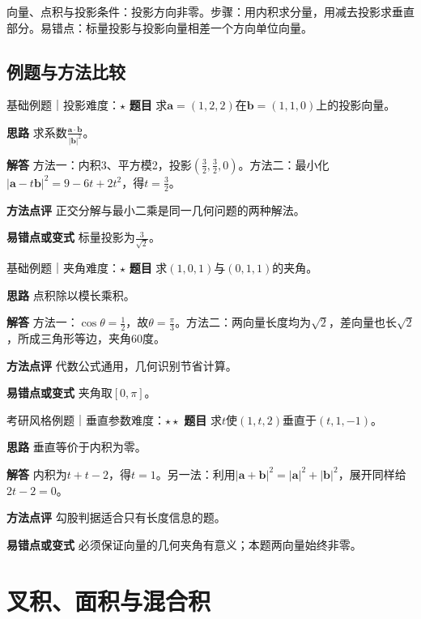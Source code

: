 \begin{method}{向量、点积与投影}条件：投影方向非零。步骤：用内积求分量，用减去投影求垂直部分。易错点：标量投影与投影向量相差一个方向单位向量。\end{method}
\subsection{例题与方法比较}
\begin{example}{基础例题｜投影}{难度：$\star$}
\label{ex:5:1}\textbf{题目} 求$\bm a=(1,2,2)$在$\bm b=(1,1,0)$上的投影向量。\par
\textbf{思路} 求系数$\frac{\bm a\cdot\bm b}{|\bm b|^2}$。\par
\textbf{解答} 方法一：内积3、平方模2，投影$(\frac{3}{2},\frac{3}{2},0)$。方法二：最小化$|\bm a-t\bm b|^2=9-6t+2t^2$，得$t=\frac{3}{2}$。\par
\textbf{方法点评} 正交分解与最小二乘是同一几何问题的两种解法。\par
\textbf{易错点或变式} 标量投影为$\frac{3}{\sqrt2}$。
\end{example}
\begin{example}{基础例题｜夹角}{难度：$\star$}
\label{ex:5:2}\textbf{题目} 求$(1,0,1)$与$(0,1,1)$的夹角。\par
\textbf{思路} 点积除以模长乘积。\par
\textbf{解答} 方法一：$\cos\theta=\frac{1}{2}$，故$\theta=\frac{\pi}{3}$。方法二：两向量长度均为$\sqrt2$，差向量也长$\sqrt2$，所成三角形等边，夹角60度。\par
\textbf{方法点评} 代数公式通用，几何识别节省计算。\par
\textbf{易错点或变式} 夹角取$[0,\pi]$。
\end{example}
\begin{example}{考研风格例题｜垂直参数}{难度：$\star\star$}
\label{ex:5:3}\textbf{题目} 求$t$使$(1,t,2)$垂直于$(t,1,-1)$。\par
\textbf{思路} 垂直等价于内积为零。\par
\textbf{解答} 内积为$t+t-2$，得$t=1$。另一法：利用$|\bm a+\bm b|^2=|\bm a|^2+|\bm b|^2$，展开同样给$2t-2=0$。\par
\textbf{方法点评} 勾股判据适合只有长度信息的题。\par
\textbf{易错点或变式} 必须保证向量的几何夹角有意义；本题两向量始终非零。
\end{example}
\section{叉积、面积与混合积}\label{sec:5:2}
